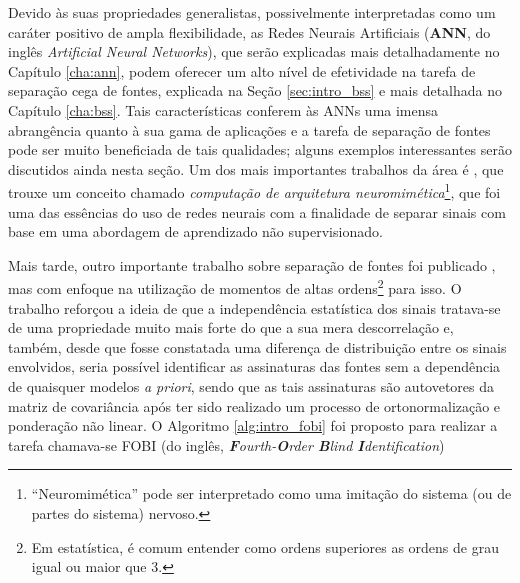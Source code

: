 Devido às suas propriedades generalistas, possivelmente interpretadas como um caráter positivo de ampla flexibilidade, as Redes Neurais Artificiais (\textbf{ANN}, do inglês \textit{Artificial Neural Networks}), que serão explicadas mais detalhadamente no Capítulo \ref{cha:ann}, podem oferecer um alto nível de efetividade na tarefa de separação cega de fontes, explicada na Seção \ref{sec:intro_bss} e mais detalhada no Capítulo \ref{cha:bss}. Tais características conferem às ANNs uma imensa abrangência quanto à sua gama de aplicações e a tarefa de separação de fontes pode ser muito beneficiada de tais qualidades; alguns exemplos interessantes serão discutidos ainda nesta seção. Um dos mais importantes trabalhos da área é \citep{herault1985detection}, que trouxe um conceito chamado \textit{computação de arquitetura neuromimética}\footnote{``Neuromimética'' pode ser interpretado como uma imitação do sistema (ou de partes do sistema) nervoso.}, que foi uma das essências do uso de redes neurais com a finalidade de separar sinais com base em uma abordagem de aprendizado não supervisionado.


Mais tarde, outro importante trabalho sobre separação de fontes foi publicado \citep{266878}, mas com enfoque na utilização de momentos de altas ordens\footnote{Em estatística, é comum entender como ordens superiores as ordens de grau igual ou maior que 3.} para isso. O trabalho reforçou a ideia de que a independência estatística dos sinais tratava-se de uma propriedade muito mais forte do que a sua mera descorrelação e, também, desde que fosse constatada uma diferença de distribuição entre os sinais envolvidos, seria possível identificar as assinaturas das fontes sem a dependência de quaisquer modelos \textit{a priori}, sendo que as tais assinaturas são autovetores da matriz de covariância após ter sido realizado um processo de ortonormalização e ponderação não linear. O Algoritmo \ref{alg:intro_fobi} foi proposto para realizar a tarefa chamava-se FOBI (do inglês, \textit{\textbf{F}ourth-\textbf{O}rder \textbf{B}lind \textbf{I}dentification})


